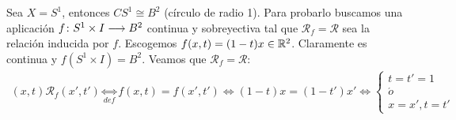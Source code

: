\documentclass[GTS.tex]{subfiles}
\begin{document}
\begin{ej} Sea $X=S^1$, entonces $CS^1\cong B^2$ (círculo de radio 1). Para probarlo buscamos una aplicación $f\colon{S^1\times I}\longrightarrow{B^2}$ continua y sobreyectiva tal que $\mathcal{R}_f=\mathcal{R}$ sea la relación inducida por $f$. Escogemos $f(x,t)=(1-t)x\in\mathbb{R}^2$. Claramente es continua y $f(S^1\times I)=B^2$. Veamos que $\mathcal{R}_f=\mathcal{R}$:
\begin{gather*}
(x,t)\mathcal{R}_f(x',t')\underset{def}{\Leftrightarrow}f(x,t)=f(x',t')\Leftrightarrow (1-t)x=(1-t')x'\Leftrightarrow\left\{\begin{array}{c}
t=t'=1 \\
\acute{o}\\
x=x', t=t'
\end{array}\right.
\end{gather*}
\end{ej}
\end{document}

